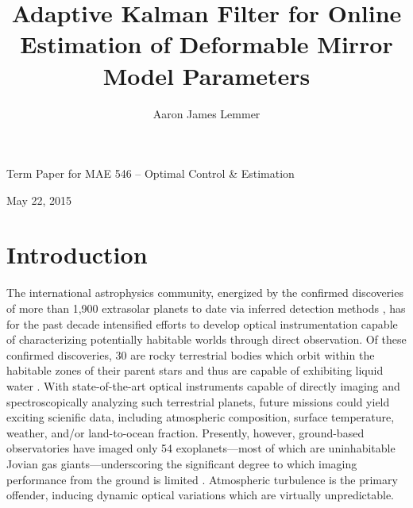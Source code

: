 \documentclass[11pt,reqno]{amsart}
\title[Adaptive Kalman Filter for Online Estimation of DM Model Parameters]{Adaptive Kalman Filter for Online Estimation of Deformable Mirror Model Parameters}
\author{Aaron James Lemmer}
\begin{document}
\begin{center} Term Paper for MAE 546 -- Optimal Control \& Estimation \end{center}
\vspace{0.2in}
\maketitle
\vspace{-0.25in}\begin{center} May 22, 2015 \end{center}


\section{Introduction}
The international astrophysics community, energized by the confirmed discoveries of more than 1,900 extrasolar planets to date via inferred detection methods \cite{Roques2015}, has for the past decade intensified efforts to develop optical instrumentation capable of characterizing potentially habitable worlds through direct observation.  Of these confirmed discoveries, 30 are rocky terrestrial bodies which orbit within the habitable zones of their parent stars and thus are capable of exhibiting liquid water \cite{Mendez2015}.  With state-of-the-art optical instruments capable of directly imaging and spectroscopically analyzing such terrestrial planets, future missions \cite{Seager2014, Spergel2013, Stapelfeldt2014} could yield exciting scienific data, including atmospheric composition, surface temperature, weather, and/or land-to-ocean fraction.  Presently, however, ground-based observatories have imaged only 54 exoplanets---most of which are uninhabitable Jovian gas giants---underscoring the significant degree to which imaging performance from the ground is limited \cite{Roques2015}.  Atmospheric turbulence is the primary offender, inducing dynamic optical variations which are virtually unpredictable.
\end{document}
